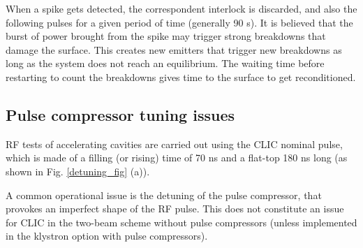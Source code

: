 When a spike gets detected, the correspondent interlock is discarded, and also the following pulses for a given period of time (generally 90 s). It is believed that the burst of power brought from the spike may trigger strong breakdowns that damage the surface. This creates new emitters that trigger new breakdowns as long as the system does not reach an equilibrium. The waiting time before restarting to count the breakdowns gives time to the surface to get reconditioned.


\subsection[Pulse compressor tuning issues]{Pulse compressor tuning issues}
\label{sec:PCtune}

RF tests of accelerating cavities are carried out using the CLIC nominal pulse, which is made of a filling (or rising) time of 70 ns and a flat-top 180 ns long (as shown in Fig. \ref{detuning_fig} (a)).

A common operational issue is the detuning of the pulse compressor, that provokes an imperfect shape of the RF pulse. This does not constitute an issue for CLIC in the two-beam scheme without pulse compressors (unless implemented in the klystron option with pulse compressors). 


